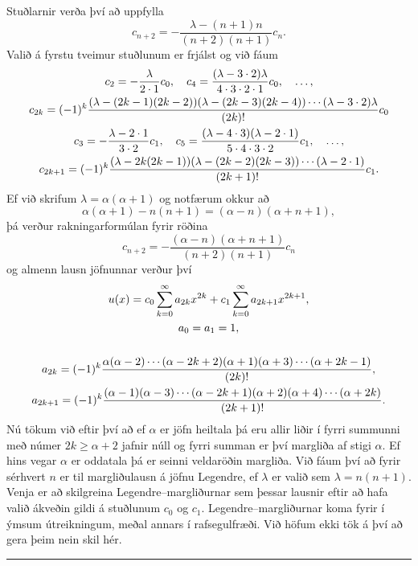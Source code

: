 \begin{sy}
Stuðlarnir verða því að uppfylla
$$
c_{n+2}=- \dfrac{\lambda-(n+1)n}{(n+2)(n+1)}c_n.
$$
Valið á fyrstu tveimur stuðlunum er frjálst og
við fáum
\begin{gather*}
c_2= -\dfrac{\lambda}{2\cdot 1}c_0, \quad
c_4= \dfrac{(\lambda-3\cdot 2)\lambda}{4\cdot 3\cdot 2\cdot
1}c_0,\quad \dots, \\
c_{2k}=(-1)\sp
k\dfrac{(\lambda-(2k-1)(2k-2))(\lambda-(2k-3)(2k-4))\cdots
(\lambda-3\cdot 2)\lambda}{(2k)!}c_0\\
c_3=- \dfrac{\lambda-2\cdot 1}{3\cdot 2}c_1, \quad
c_5= \dfrac{(\lambda-4\cdot 3)(\lambda-2\cdot 1)}{5\cdot 4\cdot 3\cdot 2}
c_1,\quad \dots,\\
c_{2k+1}=(-1)\sp
k\dfrac{(\lambda-2k(2k-1))(\lambda-(2k-2)(2k-3))\cdots
(\lambda-2\cdot 1)}{(2k+1)!}c_1.
\end{gather*}
Ef við skrifum $\lambda=\alpha(\alpha+1)$ og notfærum okkur að 
$$
\alpha(\alpha+1)-n(n+1)=(\alpha-n)(\alpha+n+1),
$$ 
þá verður rakningarformúlan fyrir röðina
$$c_{n+2}= -\dfrac{(\alpha-n)(\alpha+n+1)}{(n+2)(n+1)}c_n
$$
og almenn lausn jöfnunnar verður því 
\begin{gather*}
u(x) = c_0\sum\limits_{k=0}\sp\infty
a_{2k}
x\sp{2k}
+
c_1\sum\limits_{k=0}\sp\infty
a_{2k+1}
x\sp {2k+1},\\
a_0=a_1=1,\\
\\
a_{2k}= (-1)\sp k 
\dfrac{\alpha(\alpha-2)\cdots(\alpha-2k+2)
(\alpha+1)(\alpha+3)\cdots(\alpha+2k-1)}{(2k)!},\\
a_{2k+1}= (-1)\sp k 
\dfrac{(\alpha-1)(\alpha-3)\cdots(\alpha-2k+1)
(\alpha+2)(\alpha+4)\cdots(\alpha+2k)}{(2k+1)!}.
\end{gather*}
Nú tökum við eftir því að ef $\alpha$ er jöfn heiltala þá eru allir
liðir í fyrri summunni með númer $2k\geq \alpha+2$ jafnir núll og fyrri
summan er því margliða af stigi $\alpha$.  Ef hins vegar $\alpha$  er
oddatala þá er seinni veldaröðin margliða.  Við fáum því að fyrir
sérhvert $n$ er til margliðulausn á jöfnu
Legendre, ef $\lambda$ er
valið sem $\lambda=n(n+1)$. Venja er að skilgreina
{Legendre--margliðurnar}
sem þessar lausnir eftir að hafa valið ákveðin gildi á stuðlunum
$c_0$ og $c_1$.  Legendre--margliðurnar koma fyrir í ýmsum
útreikningum, meðal annars í rafsegulfræði.  Við höfum
ekki tök á því að gera þeim nein skil hér.
\end{sy}

\bigskip\hrule\bigskip


